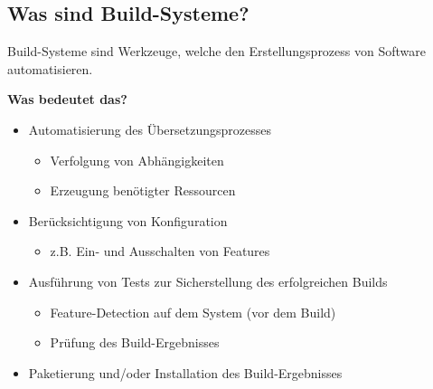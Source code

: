 \subsection{Was sind Build-Systeme?}
\begin{frame}
	\Large
	Build-Systeme sind Werkzeuge, welche den Erstellungsprozess von Software automatisieren.
\end{frame}

\begin{frame}
	\textbf{Was bedeutet das?}
	\begin{itemize}
		\pause
		\item Automatisierung des Übersetzungsprozesses
			\begin{itemize}
				\pause
				\item Verfolgung von Abhängigkeiten
				\pause
				\item Erzeugung benötigter Ressourcen
			\end{itemize}
		\pause
		\item Berücksichtigung von Konfiguration
			\begin{itemize}
			\item z.B. Ein- und Ausschalten von Features
			\end{itemize}
		\pause
		\item Ausführung von Tests zur Sicherstellung des erfolgreichen Builds
		\begin{itemize}
			\pause
			\item Feature-Detection auf dem System (vor dem Build)
			\pause
			\item Prüfung des Build-Ergebnisses
		\end{itemize}
		\pause
		\item Paketierung und/oder Installation des Build-Ergebnisses
	\end{itemize}
\end{frame}
